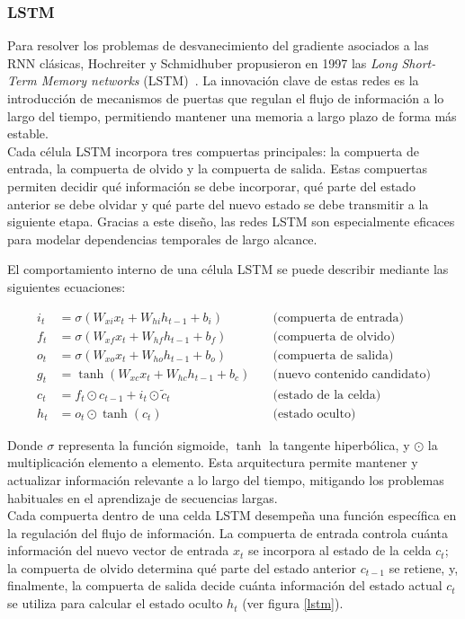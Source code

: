 \subsubsection{LSTM}

Para resolver los problemas de desvanecimiento del gradiente asociados a las RNN clásicas, Hochreiter y Schmidhuber propusieron en 1997 las \textit{Long Short-Term Memory networks} (LSTM)~\cite{10.1162/neco.1997.9.8.1735}. La innovación clave de estas redes es la introducción de mecanismos de puertas que regulan el flujo de información a lo largo del tiempo, permitiendo mantener una memoria a largo plazo de forma más estable.\\

Cada célula LSTM incorpora tres compuertas principales: la compuerta de entrada, la compuerta de olvido y la compuerta de salida. Estas compuertas permiten decidir qué información se debe incorporar, qué parte del estado anterior se debe olvidar y qué parte del nuevo estado se debe transmitir a la siguiente etapa. Gracias a este diseño, las redes LSTM son especialmente eficaces para modelar dependencias temporales de largo alcance.

El comportamiento interno de una célula LSTM se puede describir mediante las siguientes ecuaciones:

\begin{align}
	i_t &= \sigma(W_{xi}x_t + W_{hi}h_{t-1} + b_i) \quad &\text{(compuerta de entrada)} \\
	f_t &= \sigma(W_{xf}x_t + W_{hf}h_{t-1} + b_f) \quad &\text{(compuerta de olvido)} \\
	o_t &= \sigma(W_{xo}x_t + W_{ho}h_{t-1} + b_o) \quad &\text{(compuerta de salida)} \\
	g_t &= \tanh(W_{xc}x_t + W_{hc}h_{t-1} + b_c) \quad &\text{(nuevo contenido candidato)} \\
	c_t &= f_t \odot c_{t-1} + i_t \odot \tilde{c}_t \quad &\text{(estado de la celda)} \\
	h_t &= o_t \odot \tanh(c_t) \quad &\text{(estado oculto)}
\end{align}

Donde $\sigma$ representa la función sigmoide, $\tanh$ la tangente hiperbólica, y $\odot$ la multiplicación elemento a elemento. Esta arquitectura permite mantener y actualizar información relevante a lo largo del tiempo, mitigando los problemas habituales en el aprendizaje de secuencias largas.\\

Cada compuerta dentro de una celda LSTM desempeña una función específica en la regulación del flujo de información. La compuerta de entrada controla cuánta información del nuevo vector de entrada $x_t$ se incorpora al estado de la celda $c_t$; la compuerta de olvido determina qué parte del estado anterior $c_{t-1}$ se retiene, y, finalmente, la compuerta de salida decide cuánta información del estado actual $c_t$ se utiliza para calcular el estado oculto $h_t$ (ver figura \ref{lstm}).

